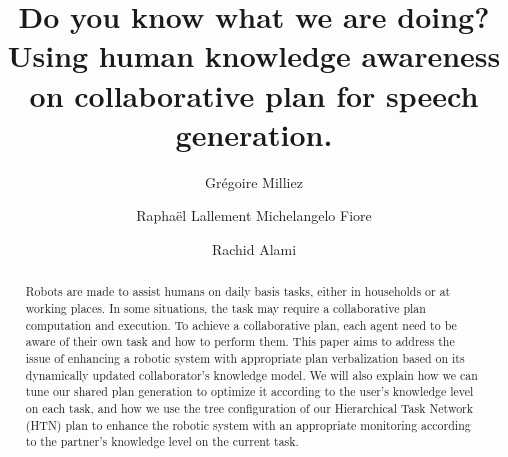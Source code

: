 \documentclass{llncs}
\begin{document}
\title{\LARGE \bf
Do you know what we are doing? Using human knowledge awareness on collaborative plan for speech generation.
}
%
%
\author{Gr\'egoire Milliez \and Rapha\"el Lallement
Michelangelo Fiore \and Rachid Alami}
%
%
%


\maketitle              %

\begin{abstract}
Robots are made to assist humans on daily basis tasks, either in households or at working places. In some situations, the task may require a collaborative plan computation and execution.
To achieve a collaborative plan, each agent need to be aware of their own task and how to perform them. This paper aims to address the issue of enhancing a robotic system with appropriate plan verbalization based on its dynamically updated collaborator's knowledge model.
 We will also explain how we can tune our shared plan generation to optimize it according to the user's knowledge level on each task, and how we use the tree configuration of our Hierarchical Task Network (HTN) plan to enhance the robotic system with an appropriate monitoring according to the partner's knowledge level on the current task.
\end{abstract}
%


\end{document}
